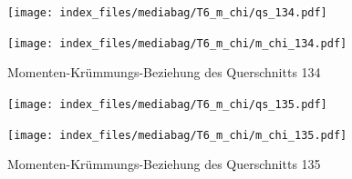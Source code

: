 \documentclass[
  11pt,
  letterpaper,
]{scrreprt}
\begin{document}
\begin{figure}[H]

\begin{minipage}{0.50\linewidth}
\texttt{[image: index\_files/mediabag/T6\_m\_chi/qs\_134.pdf]}\end{minipage}%
%
\begin{minipage}{0.50\linewidth}
\texttt{[image: index\_files/mediabag/T6\_m\_chi/m\_chi\_134.pdf]}\end{minipage}%

\caption{\label{fig-mchi_anhang}Momenten-Krümmungs-Beziehung des
Querschnitts 134}

\end{figure}%

\begin{figure}[H]

\begin{minipage}{0.50\linewidth}
\texttt{[image: index\_files/mediabag/T6\_m\_chi/qs\_135.pdf]}\end{minipage}%
%
\begin{minipage}{0.50\linewidth}
\texttt{[image: index\_files/mediabag/T6\_m\_chi/m\_chi\_135.pdf]}\end{minipage}%

\caption{\label{fig-mchi_anhang}Momenten-Krümmungs-Beziehung des
Querschnitts 135}

\end{figure}%
\end{document}
